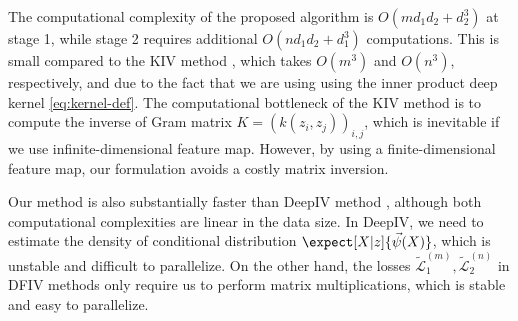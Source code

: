 The computational complexity of the proposed algorithm is $O(md_1d_2 + d_2^3)$ at stage 1, while stage 2 requires additional $O(nd_1d_2 + d_1^3)$ computations. This is small compared to the KIV method \citep{Singh2019}, which takes $O(m^3)$ and $O(n^3)$, respectively, and due to the fact that we are using using the inner product deep kernel \eqref{eq:kernel-def}. The computational bottleneck of the KIV method is to compute the inverse of Gram matrix $K=(k(z_i, z_j))_{i,j}$, which is inevitable if we use infinite-dimensional feature map. However, by using a finite-dimensional feature map, our formulation avoids a costly matrix inversion. 

Our method is also substantially faster than DeepIV method \citep{Hartford2017}, although both computational complexities are linear in the data size. In DeepIV, we need to estimate the density of conditional distribution $\expect[X|z]{\vec{\psi}(X)}$, which is unstable and difficult to parallelize. On the other hand, the losses $\tilde{\mathcal{L}}_1^{(m)}, \tilde{\mathcal{L}}_2^{(n)}$ in DFIV methods only require us to perform matrix multiplications, which is stable and easy to parallelize.